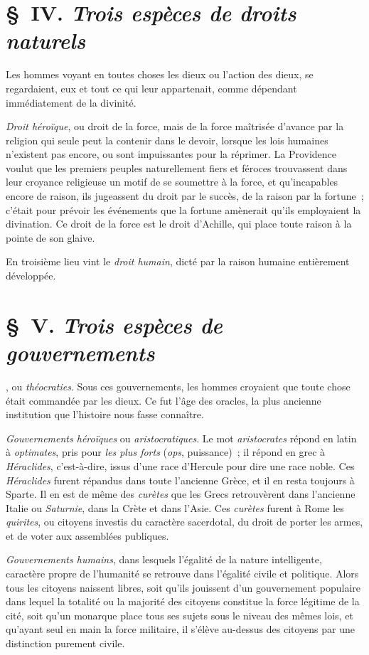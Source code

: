 \documentclass[french,twoside]{book} %
\newcommand\chapterclose{} %
\begin{document}
\section[{§ IV. Trois espèces de droits naturels}]{§ IV. {\itshape Trois espèces de droits naturels}}
 Les hommes voyant en toutes choses les dieux ou l’action des dieux, se regardaient, eux et tout ce qui leur appartenait, comme dépendant immédiatement de la divinité.\par
{\itshape Droit héroïque}, ou droit de la force, mais de la force maîtrisée d’avance par la religion qui seule peut la contenir dans le devoir, lorsque les lois humaines n’existent pas encore, ou sont impuissantes pour la réprimer. La Providence voulut que les premiers peuples naturellement fiers et féroces trouvassent dans leur croyance religieuse un motif de se soumettre à la force, et qu’incapables encore de raison, ils jugeassent du droit par le succès, de la raison par la fortune ; c’était pour prévoir les événements que la fortune amènerait qu’ils employaient la divination. Ce droit de la force est le droit d’Achille, qui place toute raison à la pointe de son glaive.\par
En troisième lieu vint le {\itshape droit humain}, dicté par la raison humaine entièrement développée.
\section[{§ V. Trois espèces de gouvernements}]{§ V. {\itshape Trois espèces de gouvernements}}
, ou {\itshape théocraties}. Sous ces gouvernements, les hommes croyaient que toute chose était commandée par les dieux. Ce fut l’âge des oracles, la plus ancienne institution que l’histoire nous fasse connaître.\par
{\itshape Gouvernements héroïques} ou {\itshape aristocratiques}. Le mot {\itshape aristocrates} répond en latin à {\itshape optimates}, pris pour {\itshape les plus forts} ({\itshape ops}, puissance) ; il répond en grec à {\itshape Héraclides}, c’est-à-dire, issus d’une race d’Hercule pour dire une race noble. Ces {\itshape Héraclides} furent répandus dans toute l’ancienne Grèce, et il en resta toujours à Sparte. Il en est de même des {\itshape curètes} que les Grecs retrouvèrent dans l’ancienne Italie ou {\itshape Saturnie}, dans la Crète et dans l’Asie. Ces {\itshape curètes} furent à Rome les {\itshape quirites}, ou citoyens investis du caractère sacerdotal, du droit de porter les armes, et de voter aux assemblées publiques.\par
{\itshape Gouvernements humains}, dans lesquels l’égalité de la nature intelligente, caractère propre de l’humanité se retrouve dans l’égalité civile et politique. Alors tous les citoyens naissent libres, soit qu’ils jouissent d’un gouvernement populaire dans lequel la totalité ou la majorité des citoyens constitue la force légitime de la cité, soit qu’un monarque place tous ses sujets sous le niveau des mêmes lois, et qu’ayant seul en main la force militaire, il s’élève au-dessus des citoyens par une distinction purement civile.
\chapterclose
\end{document}
